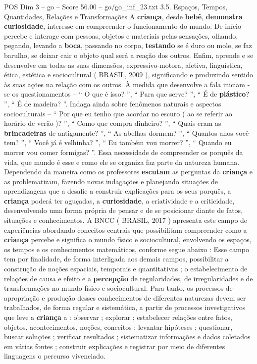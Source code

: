 \begin{textsample}{POS Dim 3 – go – Score 56.00 – go/go\_inf\_23.txt}  \label{ex:f3_pos_041}
3.5.
Espaços, Tempos, Quantidades, Relações e Transformações A \textbf{criança}, desde \textbf{bebê}, \textbf{demonstra} \textbf{curiosidade}, interesse em compreender o funcionamento do mundo.
De início percebe e interage com pessoas, objetos e materiais pelas sensações, olhando, pegando, levando a \textbf{boca}, passando no corpo, \textbf{testando} se é duro ou mole, se faz barulho, se deixar cair o objeto qual será a reação dos outros.
Enfim, aprende e se desenvolve em todas as suas dimensões, expressivo-motora, afetiva, linguística, ética, estética e sociocultural ( BRASIL, 2009 ), significando e produzindo sentido às suas ações na relação com os outros.
À medida que desenvolve a fala iniciam -se os questionamentos – “ O que é isso? ”, “ Para que serve? ”, “ É de \textbf{plástico}? ”, “ É de madeira? ”.
Indaga ainda sobre fenômenos naturais e aspectos socioculturais – “ Por que eu tenho que acordar no escuro ( ao se referir ao horário de verão )? ”, “ Como que compra dinheiro? ”, “ Quais eram as \textbf{brincadeiras} de antigamente? ”, “ As abelhas dormem? ”, “ Quantos anos você tem? ”, “ Você já é velhinha? ”, “ Eu também vou morrer? ”, “ Quando eu morrer vou comer formigas? ”.
Essa necessidade de compreender os porquês da vida, que mundo é esse e como ele se organiza faz parte da natureza humana.
Dependendo da maneira como os professores \textbf{escutam} as perguntas da \textbf{criança} e as problematizam, fazendo novas indagações e planejando situações de aprendizagens que a desafie a construir explicações para os seus porquês, a \textbf{criança} poderá ter aguçadas, a \textbf{curiosidade}, a criatividade e a criticidade, desenvolvendo uma forma própria de pensar e de se posicionar diante de fatos, situações e conhecimentos.
A BNCC ( BRASIL, 2017 ) apresenta este campo de experiências abordando conceitos centrais que possibilitam compreender como a \textbf{criança} percebe e significa o mundo físico e sociocultural, envolvendo os espaços, os tempos e os conhecimentos matemáticos, conforme segue abaixo : Esse campo tem por finalidade, de forma interligada aos demais campos, possibilitar a construção de noções espaciais, temporais e quantitativas ; o estabelecimento de relações de causa e efeito e a \textbf{percepção} de regularidades, de irregularidades e de transformações no mundo físico e sociocultural.
Para tanto, os processos de apropriação e produção desses conhecimentos de diferentes naturezas devem ser trabalhados, de forma regular e sistemática, a partir de processos investigativos que leve a \textbf{criança} a : observar ; explorar ; estabelecer relações entre fatos, objetos, acontecimentos, noções, conceitos ; levantar hipóteses ; questionar, buscar soluções ; verificar resultados ; sistematizar informações e dados coletados em várias fontes ; construir explicações e registrar por meio de diferentes linguagens o percurso vivenciado.

\end{textsample}
